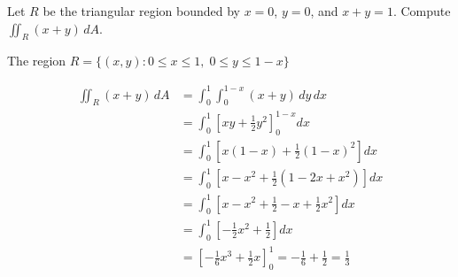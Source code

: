 \begin{eg}[Triangular Region Bounded by \(x=0\), \(y=0\), \(x+y=1\)]
  Let \(R\) be the triangular region bounded by \(x = 0\), \(y = 0\), and \(x + y = 1\). Compute \(\iint_R (x + y)\,dA\).

  The region \(R = \{(x,y): 0 \leq x \leq 1,\; 0 \leq y \leq 1 - x\}\)

  \begin{align*}
    \iint_R (x + y)\,dA &= \int_0^1 \int_0^{1-x} (x + y)\,dy\,dx \\
                        &= \int_0^1 \left[ x y + \frac{1}{2} y^2 \right]_0^{1-x} dx \\
                        &= \int_0^1 \left[ x(1 - x) + \frac{1}{2}(1 - x)^2 \right] dx \\
                        &= \int_0^1 \left[ x - x^2 + \frac{1}{2}(1 - 2x + x^2) \right] dx \\
                        &= \int_0^1 \left[ x - x^2 + \frac{1}{2} - x + \frac{1}{2}x^2 \right] dx \\
                        &= \int_0^1 \left[ -\frac{1}{2}x^2 + \frac{1}{2} \right] dx \\
                        &= \left[ -\frac{1}{6}x^3 + \frac{1}{2}x \right]_0^1 = -\frac{1}{6} + \frac{1}{2} = \frac{1}{3}
  \end{align*}
\end{eg}
